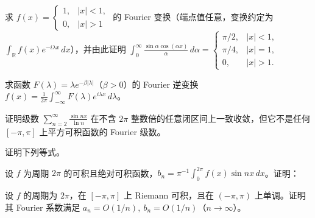 \noindent\begin{minipage}{\textwidth}
求 $f(x)=\begin{cases}1,&|x|<1,\\0,&|x|>1\end{cases}$ 的 Fourier 变换（端点值任意，变换约定为 $\int_{\mathbb R}f(x)e^{-i\lambda x}\,dx$），并由此证明 $\displaystyle\int_0^{\infty}\frac{\sin\alpha\cos(\alpha x)}{\alpha}\,d\alpha=\begin{cases}\pi/2,&|x|<1,\\\pi/4,&|x|=1,\\0,&|x|>1.\end{cases}$
\end{minipage}\par\vfill
\newpage
\noindent\begin{minipage}{\textwidth}
求函数 $F(\lambda)=\lambda e^{-\beta|\lambda|}$（$\beta>0$）的 Fourier 逆变换 $f(x)=\frac1{2\pi}\int_{-\infty}^{\infty}F(\lambda)e^{i\lambda x}\,d\lambda$。
\end{minipage}\par\vfill
\noindent\begin{minipage}{\textwidth}
证明级数 $\displaystyle\sum_{n=2}^{\infty}\frac{\sin nx}{\ln n}$ 在不含 $2\pi$ 整数倍的任意闭区间上一致收敛，但它不是任何 $[-\pi,\pi]$ 上平方可积函数的 Fourier 级数。
\end{minipage}\par\vfill
\noindent\begin{minipage}{\textwidth}
证明下列等式。
\end{minipage}\par\vfill
\noindent\begin{minipage}{\textwidth}
设 $f$ 为周期 $2\pi$ 的可积且绝对可积函数，$b_n=\pi^{-1}\int_0^{2\pi}f(x)\sin nx\,dx$。证明：
\end{minipage}\par\vfill
\newpage
\noindent\begin{minipage}{\textwidth}
设 $f$ 的周期为 $2\pi$，在 $[-\pi,\pi]$ 上 Riemann 可积，且在 $(-\pi,\pi)$ 上单调。证明其 Fourier 系数满足 $a_n=O(1/n),\ b_n=O(1/n)$（$n\to\infty$）。
\end{minipage}\par\vfill
